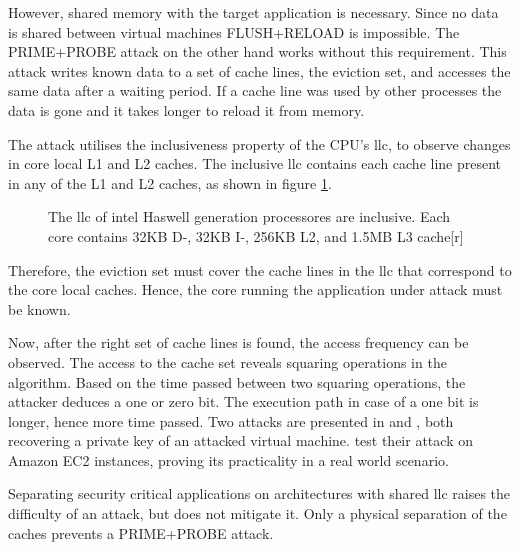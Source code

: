 However, shared memory with the target application is necessary.
Since no data is shared between virtual machines FLUSH+RELOAD is impossible.
The PRIME+PROBE attack on the other hand works without this requirement.
This attack writes known data to a set of cache lines, the eviction set,
and accesses the same data after a waiting period.
If a cache line was used by other processes the data is gone and it takes
longer to reload it from memory.

The attack utilises the inclusiveness property of the CPU's \gls{llc}, to observe
changes in core local L1 and L2 caches.
The inclusive \gls{llc} contains each cache line present in any of the L1 and
L2 caches, as shown in figure \ref{state:fig:inclusive}.
%
\begin{figure}[h]
  \setcapindent*{1em}
  \begin{captionbeside}[]{The \gls{llc} of \gls{intel} Haswell generation
    processores are inclusive.
   Each core contains 32KB D-, 32KB I-, 256KB L2, and 1.5MB L3 cache}[r]%
  
  \end{captionbeside}
  \label{state:fig:inclusive}
\end{figure}

Therefore, the eviction set must cover the cache lines in the \gls{llc} that
correspond to the core local caches.
Hence, the core running the application under attack must be known.

Now, after the right set of cache lines is found, the access frequency can be
observed.
The access to the cache set reveals squaring operations in the algorithm.
Based on the time passed between two squaring operations, the attacker deduces
a one or zero bit.
The execution path in case of a one bit is longer, hence more time passed.
Two attacks are presented in \cite{liu_last-level_2015} and
\cite{inci_seriously_2015}, both recovering a private key of an attacked
virtual machine.
\citeauthor{inci_seriously_2015} test their attack on Amazon EC2 instances,
proving its practicality in a real world scenario.

Separating security critical applications on architectures with shared
\gls{llc} raises the difficulty of an attack, but does not mitigate it.
Only a physical separation of the caches prevents a PRIME+PROBE attack.




